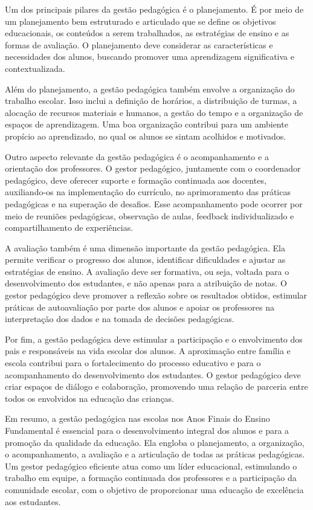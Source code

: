 Um dos principais pilares da gestão pedagógica é o planejamento. É por
meio de um planejamento bem estruturado e articulado que se define os
objetivos educacionais, os conteúdos a serem trabalhados, as estratégias
de ensino e as formas de avaliação. O planejamento deve considerar as
características e necessidades dos alunos, buscando promover uma
aprendizagem significativa e contextualizada.

Além do planejamento, a gestão pedagógica também envolve a organização
do trabalho escolar. Isso inclui a definição de horários, a distribuição
de turmas, a alocação de recursos materiais e humanos, a gestão do tempo
e a organização de espaços de aprendizagem. Uma boa organização
contribui para um ambiente propício ao aprendizado, no qual os alunos se
sintam acolhidos e motivados.

Outro aspecto relevante da gestão pedagógica é o acompanhamento e a
orientação dos professores. O gestor pedagógico, juntamente com o
coordenador pedagógico, deve oferecer suporte e formação continuada aos
docentes, auxiliando-os na implementação do currículo, no aprimoramento
das práticas pedagógicas e na superação de desafios. Esse acompanhamento
pode ocorrer por meio de reuniões pedagógicas, observação de aulas,
feedback individualizado e compartilhamento de experiências.

A avaliação também é uma dimensão importante da gestão pedagógica. Ela
permite verificar o progresso dos alunos, identificar dificuldades e
ajustar as estratégias de ensino. A avaliação deve ser formativa, ou
seja, voltada para o desenvolvimento dos estudantes, e não apenas para a
atribuição de notas. O gestor pedagógico deve promover a reflexão sobre
os resultados obtidos, estimular práticas de autoavaliação por parte dos
alunos e apoiar os professores na interpretação dos dados e na tomada de
decisões pedagógicas.

Por fim, a gestão pedagógica deve estimular a participação e o
envolvimento dos pais e responsáveis na vida escolar dos alunos. A
aproximação entre família e escola contribui para o fortalecimento do
processo educativo e para o acompanhamento do desenvolvimento dos
estudantes. O gestor pedagógico deve criar espaços de diálogo e
colaboração, promovendo uma relação de parceria entre todos os
envolvidos na educação das crianças.

Em resumo, a gestão pedagógica nas escolas nos Anos Finais do Ensino
Fundamental é essencial para o desenvolvimento integral dos alunos e
para a promoção da qualidade da educação. Ela engloba o planejamento, a
organização, o acompanhamento, a avaliação e a articulação de todas as
práticas pedagógicas. Um gestor pedagógico eficiente atua como um líder
educacional, estimulando o trabalho em equipe, a formação continuada dos
professores e a participação da comunidade escolar, com o objetivo de
proporcionar uma educação de excelência aos estudantes.

